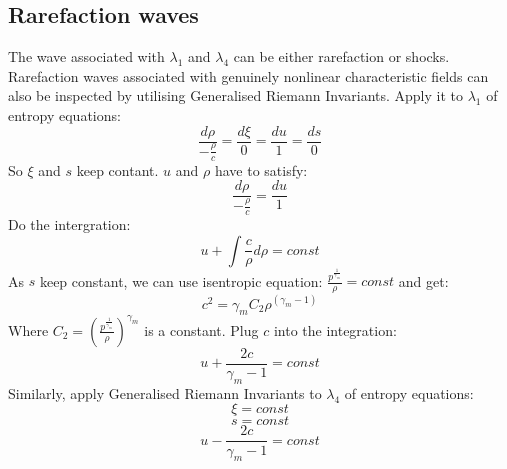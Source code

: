 \subsection{Rarefaction waves}
The wave associated with $\lambda_1$ and $\lambda_4$ can be either rarefaction or shocks.
Rarefaction waves associated with genuinely nonlinear characteristic fields can also be inspected by utilising Generalised Riemann Invariants. Apply it to $\lambda_1$ of entropy equations: 
\begin{equation}
\frac{d \rho}{-\frac{\rho}{c}}=\frac{d \xi}{0} = \frac{d u}{1} = \frac{d s}{0}
\end{equation}
So $\xi$ and $s$ keep contant. $u$ and $\rho$ have to satisfy: 
\begin{equation}
\frac{d \rho}{-\frac{\rho}{c}} = \frac{d u}{1}
\end{equation} 
Do the intergration: 
\begin{equation}
u+\int \frac{c}{\rho} d\rho =const
\end{equation}
As $s$ keep constant, we can use isentropic equation: $\frac{p^{\frac{1}{\gamma_m}}}{\rho}=const$ and get: 
\begin{equation}
c^2=\gamma_m C_2 \rho^{(\gamma_m -1)}
\end{equation}
Where $C_2 = \left(\frac{p^{\frac{1}{\gamma_m}}}{\rho}\right)^{\gamma_m}$ is a constant. Plug $c$ into the integration: 
\begin{equation}
u+\frac{2c}{\gamma_m -1} = const
\label{eq:RP-solution-rarefaction-u-lamda1}
\end{equation}
Similarly, apply Generalised Riemann Invariants to $\lambda_4$ of entropy equations:
\begin{equation}
\xi = const \label{eq:RP-solution-rarefaction-xi}
\end{equation}
\begin{equation}
s = const \label{eq:RP-solution-rarefaction-s}
\end{equation}
\begin{equation}
u-\frac{2c}{\gamma_m -1} = const 
\label{eq:RP-solution-rarefaction-u-lamda4}
\end{equation}

